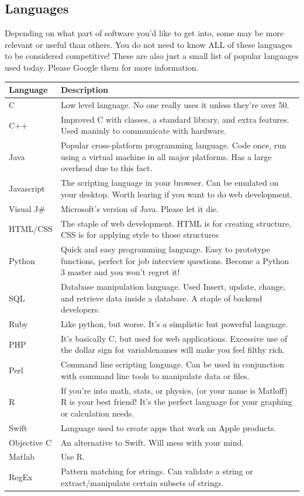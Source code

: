 \documentclass{article}
\begin{document}
\subsection{Languages}
 \hspace{0.5cm} Depending on what part of software you'd like to get into, some may be more relevant or useful than others. You do not need to know ALL of these languages to be considered competitive! These are also just a small list of popular languages used today. Please Google them for more information.\\
\begin{center}
\begin{tabular} {|p{3cm} |p{8cm}|}
\hline
\textbf{Language} & \textbf{Description}\\
\hline
C & Low level language. No one really uses it unless they're over 50.\\ 
\hline
C++ & Improved C with classes, a standard library, and extra features. Used maninly to communicate with hardware.\\ 
\hline
Java & Popular cross-platform programming language. Code once, run using a virtual machine in all major platforms. Has a large overhead due to this fact.\\
\hline
Javascript & The scripting language in your browser. Can be emulated on your desktop. Worth learing if you want to do web development.\\
\hline
Visual J\# & Microsoft's version of Java. Please let it die.\\ 
\hline
HTML/CSS & The staple of web development. HTML is for creating structure, CSS is for applying style to those structures\\
\hline
Python & Quick and easy programming language. Easy to prototype functions, perfect for job interview questions. Become a Python 3 master and you won't regret it!\\
\hline
SQL & Database manipulation language. Used Insert, update, change, and retrieve data inside a database. A staple of backend developers.\\
\hline
Ruby & Like python, but worse. It's a simplistic but powerful language.\\
\hline
PHP & It's basically C, but used for web applications. Excessive use of the dollar sign for variablenames will make you feel filthy rich.\\
\hline
Perl & Command line scripting language. Can be used in conjunction with command line tools to manipulate data or files.\\
\hline
R & If you're into math, stats, or physics, (or your name is Matloff) R is your best friend! It's the perfect language for your graphing or calculation needs.\\
\hline
Swift & Language used to create apps that work on Apple products.\\
\hline
Objective C & An alternative to Swift. Will mess with your mind.\\
\hline
Matlab & Use R.\\
\hline
RegEx & Pattern matching for strings. Can validate a string or extract/manipulate certain subsets of strings.\\
\hline
\end{tabular}
\end{center}
\end{document}
